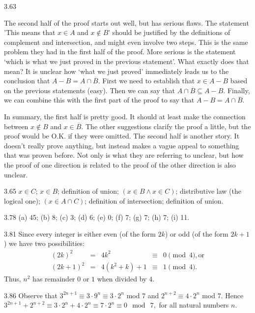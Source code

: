 \begin{Answer}{3.63}
\begin{pfevalenum}
The second half of the proof starts out well, but has serious flaws.
The statement 'This means that $x\in A$ and $x\not\in B$'
should be justified by the definitions of complement and intersection, and might even involve two steps.
This is the same problem they had in the first half of the proof.
More serious is the statement `which is what we just proved in the previous statement'.  What exactly does
that mean?  It is unclear how `what we just proved' immediately leads us to the conclusion that
$A-B = A\cap\overline{B}$.  First we need to establish that $x\in A-B$ based on the previous statements (easy).
Then we can say that $A\cap\overline{B}\subseteq A-B$.  Finally, we can combine this with the first part
of the proof to say that $A-B = A\cap\overline{B}$.

In summary, the first half is pretty good.  It should at least make the connection between
$x\not\in B$ and $x\in\overline{B}$.  The other suggestions clarify the proof a little,
but the proof would be O.K. if they were omitted.  The second half is another story.  It doesn't really
prove anything, but instead makes a vague appeal to something that was proven before.  Not only is
what they are referring to unclear, but how the proof of one direction is related to the proof of
the other direction is also unclear.
\end{pfevalenum}
\end{Answer}
\begin{Answer}{3.65}
$x\in C$;
$x\in B$;
definition of union;
$(x\in B \wedge x\in C)$;
distributive law (the logical one);
$(x\in A\cap C) $;
definition of intersection;
definition of union.
\end{Answer}
\begin{Answer}{3.78}
(a) 45; (b) 8; (c) 3; (d) 6; (e) 0; (f) 7; (g) 7; (h) 7; (i) 11.
\end{Answer}
\begin{Answer}{3.81}
Since every integer is either even (of the form $2k$) or odd (of
the form $2k + 1$) we have two possibilities:
$$\begin{array}{lllll}(2k)^2 & = & 4k^2&\equiv&0\pmod 4, \mbox{or}\\
(2k + 1)^2 & = & 4(k^2 + k) + 1&\equiv&1\pmod 4.
  \end{array}$$
Thus, $n^2$ has remainder $0$ or $1$ when divided by $4$.
\end{Answer}
\begin{Answer}{3.86}
Observe that $3^{2n + 1} \equiv 3\cdot 9^n \equiv 3\cdot
2^n$ mod 7 and $2^{n + 2} \equiv 4\cdot 2^n$ mod 7. Hence
$ 3^{2n + 1} + 2^{n + 2} \equiv 3\cdot 2^n+4\cdot 2^n\equiv 7\cdot 2^n \equiv 0 \  \bmod  \ 7,$
for all
natural numbers $n.$
\end{Answer}
